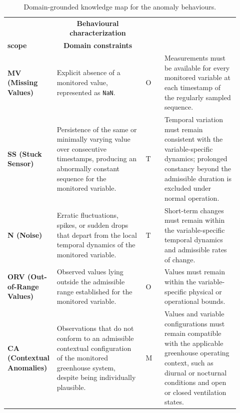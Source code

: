 \documentclass[preprint,12pt]{elsarticle}
\begin{document}
\begin{table}[!t]
\caption{Domain-grounded knowledge map for the anomaly behaviours.}
\label{tab:knowledge_map}
\centering
\scriptsize
\setlength{\tabcolsep}{2pt}
\renewcommand{\arraystretch}{1.12}

\begin{tabular}{
>{\centering\arraybackslash}m{0.14\linewidth}
p{0.38\linewidth}
>{\centering\arraybackslash}m{0.08\linewidth}
p{0.32\linewidth}
}
\hline

\multicolumn{1}{c}{\textbf{Behaviour}} &
\multicolumn{1}{c}{\textbf{Behavioural characterization}} &
\multicolumn{1}{c}{\shortstack{\textbf{Evidence}\\\textbf{scope}}} &
\multicolumn{1}{c}{\textbf{Domain constraints}} \\

\hline

\textbf{MV (Missing Values)} &
Explicit absence of a monitored value, represented as \texttt{NaN}. &
\(\mathrm{O}\) &
Measurements must be available for every monitored variable at each
timestamp of the regularly sampled sequence. \\[1mm]

\textbf{SS (Stuck Sensor)} &
Persistence of the same or minimally varying value over consecutive
timestamps, producing an abnormally constant sequence for the monitored
variable. &
\(\mathrm{T}\) &
Temporal variation must remain consistent with the variable-specific
dynamics; prolonged constancy beyond the admissible duration is excluded
under normal operation. \\[1mm]

\textbf{N (Noise)} &
Erratic fluctuations, spikes, or sudden drops that depart from the local
temporal dynamics of the monitored variable. &
\(\mathrm{T}\) &
Short-term changes must remain within the variable-specific temporal
dynamics and admissible rates of change. \\[1mm]

\textbf{ORV (Out-of-Range Values)} &
Observed values lying outside the admissible range established for the
monitored variable. &
\(\mathrm{O}\) &
Values must remain within the variable-specific physical or operational
bounds. \\[1mm]

\textbf{CA (Contextual Anomalies)} &
Observations that do not conform to an admissible contextual configuration
of the monitored greenhouse system, despite being individually plausible. &
\(\mathrm{M}\) &
Values and variable configurations must remain compatible with the
applicable greenhouse operating context, such as diurnal or nocturnal
conditions and open or closed ventilation states. \\[1mm]


\end{tabular}
\end{table}
\end{document}
